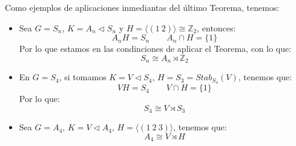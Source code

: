 \begin{ejemplo}
    Como ejemplos de aplicaciones inmediantas del último Teorema, tenemos:
    \begin{itemize}
        \item Sea $G = S_n$, $K = A_n \lhd S_n$ y $H = \langle (1\ 2) \rangle \cong \mathbb{Z}_2 $, entonces:
            \begin{equation*}
                A_n H = S_n \qquad A_n\cap H = \{1\}
            \end{equation*}
            Por lo que estamos en las condinciones de aplicar el Teorema, con lo que:
            \begin{equation*}
                S_n\cong A_n \rtimes \mathbb{Z}_2
            \end{equation*}
        \item En $G = S_4$, si tomamos $K = V\lhd S_4$, $H = S_3 = Stab_{S_4}(V)$, tenemos que:
            \begin{equation*}
                VH = S_4 \qquad V\cap H = \{1\}
            \end{equation*}
            Por lo que:
            \begin{equation*}
                S_4\cong V\rtimes S_3
            \end{equation*}
        \item Sea $G = A_4$, $K = V\lhd A_4$, $H = \langle (1\ 2\ 3) \rangle $, tenemos que:
            \begin{equation*}
                A_4\cong V\rtimes H
            \end{equation*}
    \end{itemize}
\end{ejemplo}

